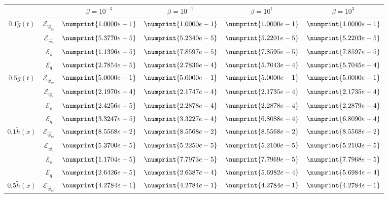\documentclass[11pt, a4paper]{article}
\theoremstyle{definition}
\newcommand{\adj}{q}
\begin{document}
\begin{table}
	\begin{tabular}{ | c | c || c | c | c | c ||}
		\hline
		\multicolumn{2}{|c||}{} & $\beta = 10^{-3}$ & $\beta = 10^{-1}$ & $\beta = 10^{1}$ & $\beta = 10^{3}$  \\
		\hline
		\hline
		\multirow{4}{*}{$0.1 \tilde g(t)$} & $\mathcal{E}_{\vec{w}_{uc}}$ & $\numprint{1.0000e-1}$ & $\numprint{1.0000e-1}$ & $\numprint{1.0000e-1}$ & $\numprint{1.0000e-1}$ \\
		& $\mathcal{E}_{\vec{w}_c}$ & $\numprint{5.3770e-5}$ & $\numprint{5.2340e-5}$ & $\numprint{5.2201e-5}$ & $\numprint{5.2203e-5}$ \\
		& $\mathcal{E}_{\rho}$ & $\numprint{1.1396e-5}$ & $\numprint{7.8597e-5}$ & $\numprint{7.8595e-5}$ & $\numprint{7.8597e-5}$ \\
		& $\mathcal{E}_{\adj}$ & $\numprint{2.7854e-5}$ & $\numprint{2.7836e-4}$ & $\numprint{5.7043e-4}$ & $\numprint{5.7045e-4}$ \\
		\hline
		\multirow{4}{*}{$0.5 \tilde g(t)$} & $\mathcal{E}_{\vec{w}_{uc}}$ & $\numprint{5.0000e-1}$ & $\numprint{5.0000e-1}$ & $\numprint{5.0000e-1}$ & $\numprint{5.0000e-1}$ \\
		& $\mathcal{E}_{\vec{w}_c}$ & $\numprint{2.1970e-4}$ & $\numprint{2.1747e-4}$ & $\numprint{2.1735e-4}$ & $\numprint{2.1735e-4}$ \\
		& $\mathcal{E}_{\rho}$ & $\numprint{2.4256e-5}$ & $\numprint{2.2878e-4}$ & $\numprint{2.2878e-4}$ & $\numprint{2.2879e-4}$ \\
		& $\mathcal{E}_{\adj}$ & $\numprint{3.3247e-5}$ & $\numprint{3.3227e-4}$ & $\numprint{6.8088e-4}$ & $\numprint{6.8090e-4}$ \\
		\hline
		\multirow{4}{*}{$0.1 \tilde h(x)$} & $\mathcal{E}_{\vec{w}_{uc}}$ & $\numprint{8.5568e-2}$ & $\numprint{8.5568e-2}$ & $\numprint{8.5568e-2}$ & $\numprint{8.5568e-2}$ \\
		& $\mathcal{E}_{\vec{w}_c}$ & $\numprint{5.3700e-5}$ & $\numprint{5.2250e-5}$ & $\numprint{5.2100e-5}$ & $\numprint{5.2103e-5}$ \\
		& $\mathcal{E}_{\rho}$ & $\numprint{1.1704e-5}$ & $\numprint{7.7973e-5}$ & $\numprint{7.7969e-5}$ & $\numprint{7.7968e-5}$ \\
		& $\mathcal{E}_{\adj}$ & $\numprint{2.6426e-5}$ & $\numprint{2.6387e-4}$ & $\numprint{5.6982e-4}$ & $\numprint{5.6984e-4}$ \\
		\hline
		\multirow{4}{*}{$0.5 \tilde h(x)$} & $\mathcal{E}_{\vec{w}_{uc}}$ & $\numprint{4.2784e-1}$ & $\numprint{4.2784e-1}$ & $\numprint{4.2784e-1}$ & $\numprint{4.2784e-1}$ \\

\end{tabular}
\end{table}
\end{document}
